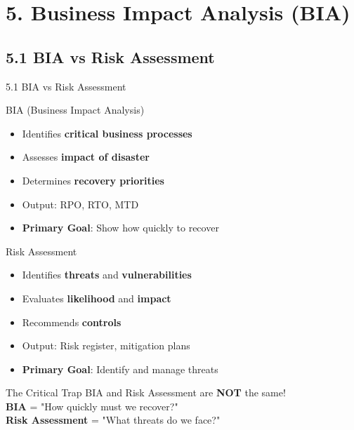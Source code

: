\documentclass[9pt]{beamer}  %
\begin{document}
	\section{5. Business Impact Analysis (BIA)}
	
	\subsection{5.1 BIA vs Risk Assessment}
	\begin{frame}{5.1 BIA vs Risk Assessment}
		\begin{block}{BIA (Business Impact Analysis)}
			\begin{itemize}
				\item Identifies \textbf{critical business processes}
				\item Assesses \textbf{impact of disaster}
				\item Determines \textbf{recovery priorities}
				\item Output: RPO, RTO, MTD
				\item \textbf{Primary Goal}: Show how quickly to recover
			\end{itemize}
		\end{block}
		
		\begin{block}{Risk Assessment}
			\begin{itemize}
				\item Identifies \textbf{threats} and \textbf{vulnerabilities}
				\item Evaluates \textbf{likelihood} and \textbf{impact}
				\item Recommends \textbf{controls}
				\item Output: Risk register, mitigation plans
				\item \textbf{Primary Goal}: Identify and manage threats
			\end{itemize}
		\end{block}
		
		\begin{alertblock}{The Critical Trap}
			BIA and Risk Assessment are \textbf{NOT} the same! \\
			\textbf{BIA} = "How quickly must we recover?" \\
			\textbf{Risk Assessment} = "What threats do we face?"
		\end{alertblock}
	\end{frame}
	
\end{document}
